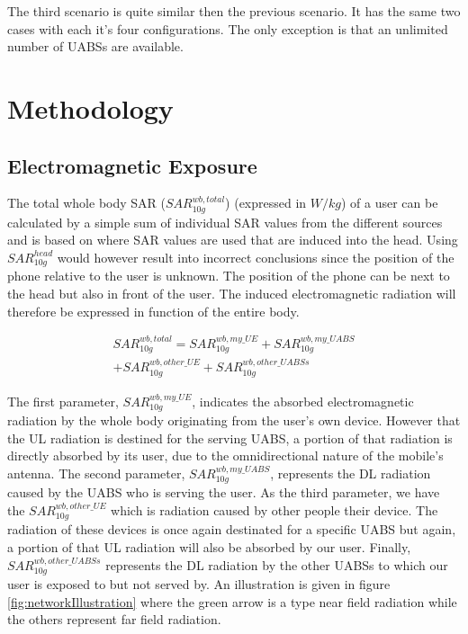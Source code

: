 \documentclass[twocolumn]{phdsymp} %
\begin{document}
The third scenario is quite similar then the previous scenario. It has the same 
two cases with each it's four configurations. The only exception is that an unlimited number of UABSs are available.

\section{Methodology}

\subsection{Electromagnetic Exposure}


The total whole body SAR ($SAR^{wb,total}_{10g}$) (expressed in $W/kg$) of a user can be calculated by a simple sum of individual SAR values from the different sources
and is based on \cite{J17_kuehn2019modelling} where SAR values are used that are induced into the head.
Using $SAR^{head}_{10g}$ would however result into incorrect conclusions since 
the position of the phone relative to the user is unknown. 
The position of the phone can be next to the head but also in front of the user.
The induced electromagnetic radiation will therefore be expressed in function of the entire body.


\begin{equation} 
\begin{aligned}
SAR^{wb,total}_{10g} = SAR^{wb,my\_UE}_{10g} +  SAR^{wb,my\_UABS}_{10g} \\
+ SAR^{wb,other\_UE}_{10g} + SAR^{wb,other\_UABSs}_{10g}
\end{aligned}
\label{eq:overallSARwb}
\end{equation}

The first parameter, $SAR^{wb,my\_UE}_{10g}$, indicates the absorbed electromagnetic radiation by the whole body originating from the user's own device. However that the 
\gls{UL} radiation is destined for the serving \gls{UABS}, a portion of that radiation is directly absorbed by its user, due to the omnidirectional nature of the mobile's antenna.
The second parameter, $SAR^{wb,my\_UABS}_{10g}$, represents the \gls{DL} radiation caused by the \gls{UABS} who is serving the user.
As the third parameter, we have the $SAR^{wb,other\_UE}_{10g}$ which is radiation caused by other people their device. The radiation of these devices is once again 
destinated for a specific \gls{UABS} but again, a portion of that \gls{UL} radiation will also be absorbed by our user.
Finally, $SAR^{wb,other\_UABSs}_{10g}$ represents the \gls{DL} radiation by the other UABSs to which our user is exposed to but not served by.
An illustration is given in figure \ref{fig:networkIllustration} where the green arrow is a type near field radiation while 
the others represent far field radiation.
\end{document}
